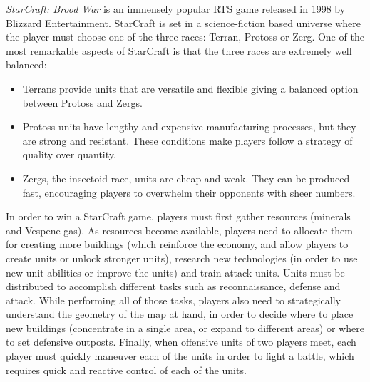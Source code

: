 \documentclass{llncs}
\begin{document}
{\em StarCraft: Brood  War} is an immensely popular  RTS game released
in   1998  by   Blizzard  Entertainment.   StarCraft  is   set  in   a
science-fiction based universe where the player must choose one of the
three  races: Terran,  Protoss or  Zerg.  One of  the most  remarkable
aspects  of StarCraft  is  that  the three  races  are extremely  well
balanced:

\begin{itemize}
\item Terrans provide  units that are versatile and  flexible giving a
  balanced option between Protoss and Zergs.
\item  Protoss   units  have   lengthy  and   expensive  manufacturing
  processes, but they are strong and resistant.  These conditions make
  players follow a strategy of quality over quantity.
\item Zergs, the insectoid race, units are cheap and weak. They can be
  produced fast, encouraging players to overwhelm their opponents with
  sheer numbers.
\end{itemize}

In order to win a StarCraft  game, players must first gather resources
(minerals  and Vespene  gas). As  resources become  available, players
need to allocate them for creating more buildings (which reinforce the
economy, and allow players to  create units or unlock stronger units),
research  new technologies  (in order  to  use new  unit abilities  or
improve the units)  and train attack units. Units  must be distributed
to  accomplish different  tasks  such as  reconnaissance, defense  and
attack.  While  performing all  of those tasks,  players also  need to
strategically understand the geometry of the  map at hand, in order to
decide where to place new buildings  (concentrate in a single area, or
expand  to  different  areas)  or where  to  set  defensive  outposts.
Finally, when  offensive units of  two players meet, each  player must
quickly maneuver each  of the units in order to  fight a battle, which
requires quick and reactive control of each of the units.

\end{document}
